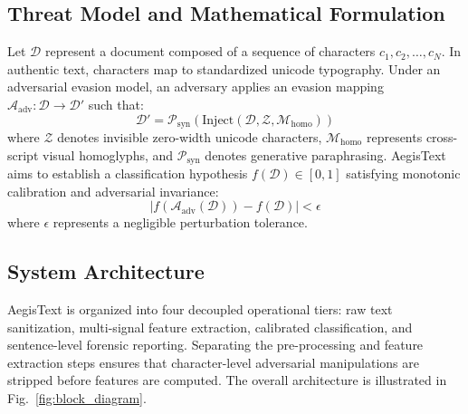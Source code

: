 \documentclass[conference]{IEEEtran}
\begin{document}
\subsection{Threat Model and Mathematical Formulation}
Let $\mathcal{D}$ represent a document composed of a sequence of characters $c_1, c_2, \dots, c_N$. In authentic text, characters map to standardized unicode typography. Under an adversarial evasion model, an adversary applies an evasion mapping $\mathcal{A}_{\text{adv}}: \mathcal{D} \to \mathcal{D}'$ such that:
\begin{equation}
\label{eq:threat_model}
    \mathcal{D}' = \mathcal{P}_{\text{syn}}\left( \text{Inject}\left( \mathcal{D}, \mathcal{Z}, \mathcal{M}_{\text{homo}} \right) \right)
\end{equation}
where $\mathcal{Z}$ denotes invisible zero-width unicode characters, $\mathcal{M}_{\text{homo}}$ represents cross-script visual homoglyphs, and $\mathcal{P}_{\text{syn}}$ denotes generative paraphrasing. AegisText aims to establish a classification hypothesis $f(\mathcal{D}) \in [0, 1]$ satisfying monotonic calibration and adversarial invariance:
\begin{equation}
\label{eq:invariance}
    \left| f(\mathcal{A}_{\text{adv}}(\mathcal{D})) - f(\mathcal{D}) \right| < \epsilon
\end{equation}
where $\epsilon$ represents a negligible perturbation tolerance.

\subsection{System Architecture}
AegisText is organized into four decoupled operational tiers: raw text sanitization, multi-signal feature extraction, calibrated classification, and sentence-level forensic reporting. Separating the pre-processing and feature extraction steps ensures that character-level adversarial manipulations are stripped before features are computed. The overall architecture is illustrated in Fig.~\ref{fig:block_diagram}.
\end{document}
